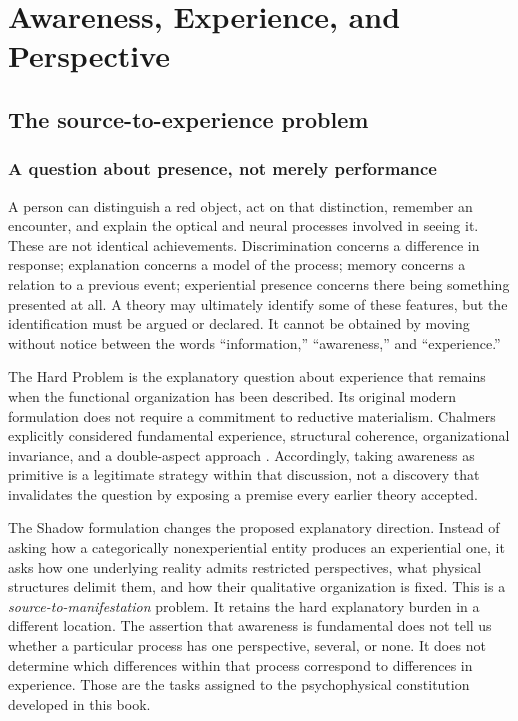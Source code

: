 \part{Awareness, Experience, and Perspective}\label{part:philosophy}
\chapter{The source-to-experience problem}\label{ch:problem}
\section{A question about presence, not merely performance}\label{section:problem:a-question-about-presence-not-merely-performance}
A person can distinguish a red object, act on that distinction, remember an encounter, and explain the optical and neural processes involved in seeing it. These are not identical achievements. Discrimination concerns a difference in response; explanation concerns a model of the process; memory concerns a relation to a previous event; experiential presence concerns there being something presented at all. A theory may ultimately identify some of these features, but the identification must be argued or declared. It cannot be obtained by moving without notice between the words ``information,'' ``awareness,'' and ``experience.''

The Hard Problem is the explanatory question about experience that remains when the functional organization has been described. Its original modern formulation does not require a commitment to reductive materialism. Chalmers explicitly considered fundamental experience, structural coherence, organizational invariance, and a double-aspect approach \cite{Chalmers1995}. Accordingly, taking awareness as primitive is a legitimate strategy within that discussion, not a discovery that invalidates the question by exposing a premise every earlier theory accepted.

The Shadow formulation changes the proposed explanatory direction. Instead of asking how a categorically nonexperiential entity produces an experiential one, it asks how one underlying reality admits restricted perspectives, what physical structures delimit them, and how their qualitative organization is fixed. This is a \emph{source-to-manifestation} problem. It retains the hard explanatory burden in a different location. The assertion that awareness is fundamental does not tell us whether a particular process has one perspective, several, or none. It does not determine which differences within that process correspond to differences in experience. Those are the tasks assigned to the psychophysical constitution developed in this book.

